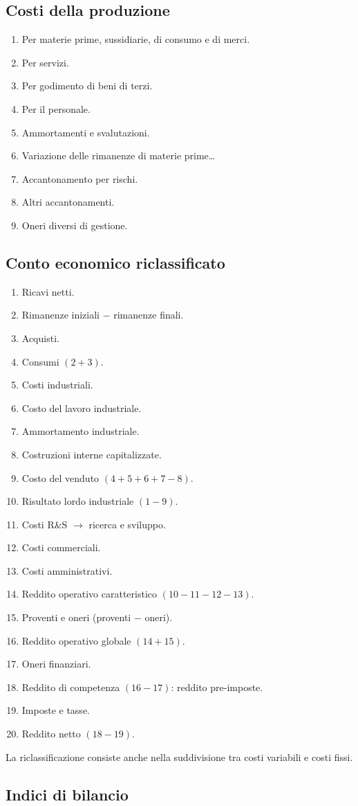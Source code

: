 \documentclass[11pt,a4paper]{article}
\newcommand{\orig}[1]{\clearpage}
\begin{document}
\subsection*{Costi della produzione}
\begin{enumerate}[start=6]
\item Per materie prime, sussidiarie, di consumo e di merci.
\item Per servizi.
\item Per godimento di beni di terzi.
\item Per il personale.
\item Ammortamenti e svalutazioni.
\item Variazione delle rimanenze di materie prime\ldots
\item Accantonamento per rischi.
\item Altri accantonamenti.
\item Oneri diversi di gestione.
\end{enumerate}
\orig{29}\subsection*{Conto economico riclassificato}
\begin{enumerate}
\item Ricavi netti.
\item Rimanenze iniziali $-$ rimanenze finali.
\item Acquisti.
\item Consumi $(2+3)$.
\item Costi industriali.
\item Costo del lavoro industriale.
\item Ammortamento industriale.
\item Costruzioni interne capitalizzate.
\item Costo del venduto $(4+5+6+7-8)$.
\item Risultato lordo industriale $(1-9)$.
\item Costi R\&S $\to$ ricerca e sviluppo.
\item Costi commerciali.
\item Costi amministrativi.
\item Reddito operativo caratteristico $(10-11-12-13)$.
\item Proventi e oneri (proventi $-$ oneri).
\item Reddito operativo globale $(14+15)$.
\item Oneri finanziari.
\item Reddito di competenza $(16-17)$: reddito pre-imposte.
\item Imposte e tasse.
\item Reddito netto $(18-19)$.
\end{enumerate}
La riclassificazione consiste anche nella suddivisione tra costi variabili e costi fissi.
\orig{30}\subsection*{Indici di bilancio}
\end{document}
